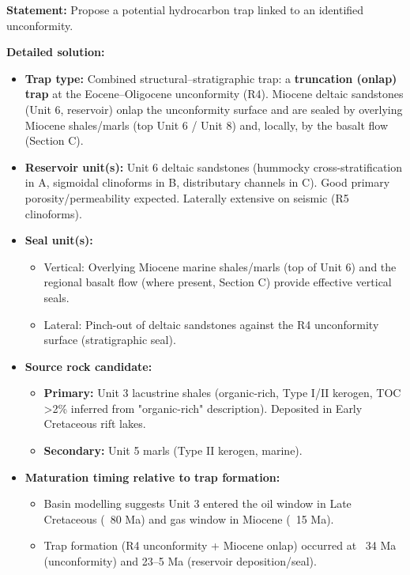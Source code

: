\documentclass[11pt]{article}
\newcommand{\cle}[1]{{\popxbold\color{popdark}#1}}
\begin{document}
\begin{exoresolu}
\textbf{Statement:} Propose a potential hydrocarbon trap linked to an identified unconformity.

\tcblower
\textbf{Detailed solution:}
\begin{itemize}
    \item \textbf{Trap type:} Combined \cle{structural–stratigraphic trap}: a \textbf{truncation (onlap) trap} at the Eocene–Oligocene unconformity (R4). Miocene deltaic sandstones (Unit 6, reservoir) onlap the unconformity surface and are sealed by overlying Miocene shales/marls (top Unit 6 / Unit 8) and, locally, by the basalt flow (Section C).
    \item \textbf{Reservoir unit(s):} Unit 6 deltaic sandstones (hummocky cross-stratification in A, sigmoidal clinoforms in B, distributary channels in C). Good primary porosity/permeability expected. Laterally extensive on seismic (R5 clinoforms).
    \item \textbf{Seal unit(s):} 
    \begin{itemize}
        \item Vertical: Overlying Miocene marine shales/marls (top of Unit 6) and the regional basalt flow (where present, Section C) provide effective vertical seals.
        \item Lateral: Pinch-out of deltaic sandstones against the R4 unconformity surface (stratigraphic seal).
    \end{itemize}
    \item \textbf{Source rock candidate:} 
    \begin{itemize}
        \item \textbf{Primary:} Unit 3 lacustrine shales (organic-rich, Type I/II kerogen, TOC >2\% inferred from "organic-rich" description). Deposited in Early Cretaceous rift lakes.
        \item \textbf{Secondary:} Unit 5 marls (Type II kerogen, marine).
    \end{itemize}
    \item \textbf{Maturation timing relative to trap formation:} 
    \begin{itemize}
        \item Basin modelling suggests Unit 3 entered the oil window in Late Cretaceous (~80 Ma) and gas window in Miocene (~15 Ma).
        \item Trap formation (R4 unconformity + Miocene onlap) occurred at ~34 Ma (unconformity) and 23–5 Ma (reservoir deposition/seal). 

\end{itemize}
\end{itemize}
\end{exoresolu}
\end{document}
